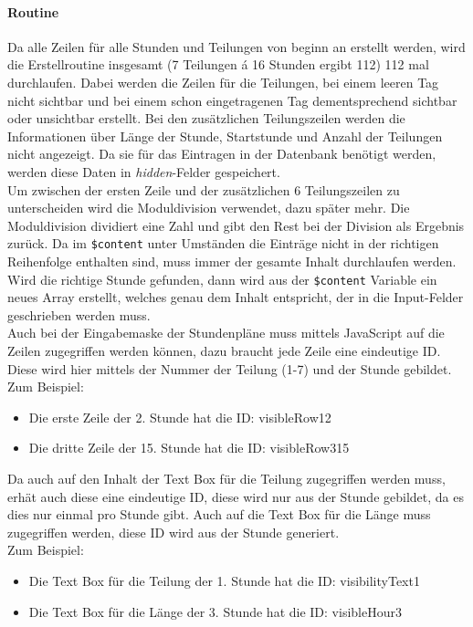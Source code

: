 \paragraph{Routine\\}
Da alle Zeilen für alle Stunden und Teilungen von beginn an erstellt werden, wird die Erstellroutine insgesamt (7 Teilungen \'{a} 16 Stunden ergibt 112) 112 mal durchlaufen. Dabei werden die Zeilen für die Teilungen, bei einem leeren Tag nicht sichtbar und bei einem schon eingetragenen Tag dementsprechend sichtbar oder unsichtbar erstellt. Bei den zusätzlichen Teilungszeilen werden die Informationen über Länge der Stunde, Startstunde und Anzahl der Teilungen nicht angezeigt. Da sie für das Eintragen in der Datenbank benötigt werden, werden diese Daten in \textit{hidden}-Felder gespeichert.\\
Um zwischen der ersten Zeile und der zusätzlichen 6 Teilungszeilen zu unterscheiden wird die Moduldivision verwendet, dazu später mehr. Die Moduldivision dividiert eine Zahl und gibt den Rest bei der Division als Ergebnis zurück. Da im \texttt{\$content} unter Umständen die Einträge nicht in der richtigen Reihenfolge enthalten sind, muss immer der gesamte Inhalt durchlaufen werden. Wird die richtige Stunde gefunden, dann wird aus der \texttt{\$content} Variable ein neues Array erstellt, welches genau dem Inhalt entspricht, der in die Input-Felder geschrieben werden muss.\\
Auch bei der Eingabemaske der Stundenpläne muss mittels JavaScript auf die Zeilen zugegriffen werden können, dazu braucht jede Zeile eine eindeutige ID. Diese wird hier mittels der Nummer der Teilung (1-7) und der Stunde gebildet.\\ 
Zum Beispiel:
\begin{itemize}
	\item Die erste Zeile der 2. Stunde hat die ID: visibleRow12
	\item Die dritte Zeile der 15. Stunde hat die ID: visibleRow315
\end{itemize}
Da auch auf den Inhalt der Text Box für die Teilung zugegriffen werden muss, erhät auch diese eine eindeutige ID, diese wird nur aus der Stunde gebildet, da es dies nur einmal pro Stunde gibt. Auch auf die Text Box für die Länge muss zugegriffen werden, diese ID wird aus der Stunde generiert.\\
Zum Beispiel:
\begin{itemize}
	\item Die Text Box für die Teilung der 1. Stunde hat die ID: visibilityText1
	\item Die Text Box für die Länge der 3. Stunde hat die ID: visibleHour3
\end{itemize}
